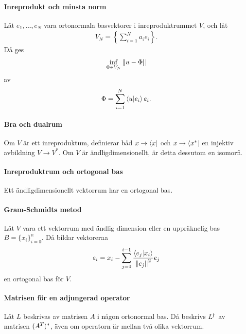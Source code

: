 \paragraph{Inreprodukt och minsta norm}
Låt $e_{1}, \dots, e_{N}$ vara ortonormala basvektorer i inreproduktrummet $V$, och låt
\begin{align*}
	V_{N} = \left\{\sum\limits_{i = 1}^{N}a_{i}e_{i}\right\}.
\end{align*}
Då ges
\begin{align*}
	\inf\limits_{\Phi\in V_{N}}\norm{u - \Phi}
\end{align*}
av
\begin{align*}
	\Phi = \sum\limits_{i = 1}^{N}\bra{u}\ket{e_{i}}e_{i}.
\end{align*}

\proof

\paragraph{Bra och dualrum}
Om $V$ är ett inreproduktum, definierar båd $x\to\bra{x}$ och $x\to\bra{x^{*}}$ en injektiv avbildning $V\to V^{*}$. Om $V$ är ändligdimensionellt, är detta dessutom en isomorfi.

\proof

\paragraph{Inreproduktrum och ortogonal bas}
Ett ändligdimensionellt vektorrum har en ortogonal bas.

\proof

\paragraph{Gram-Schmidts metod}
Låt $V$ vara ett vektorrum med ändlig dimension eller en uppräknelig bas $B = \{x_{i}\}_{i= 0}^{n}$. Då bildar vektorerna
\begin{align*}
	e_{i} = x_{i} - \sum\limits_{j = 0}^{i - 1}\frac{\bra{e_{j}}\ket{x_{i}}}{\norm{e_{j}}^{2}}e_{j}
\end{align*}
en ortogonal bas för $V$.

\proof

\paragraph{Matrisen för en adjungerad operator}
Låt $L$ beskrivas av matrisen $A$ i någon ortonormal bas. Då beskrivs $L^{\dagger}$ av matrisen $(A^{T})^{*}$, även om operatorn är mellan två olika vektorrum.

